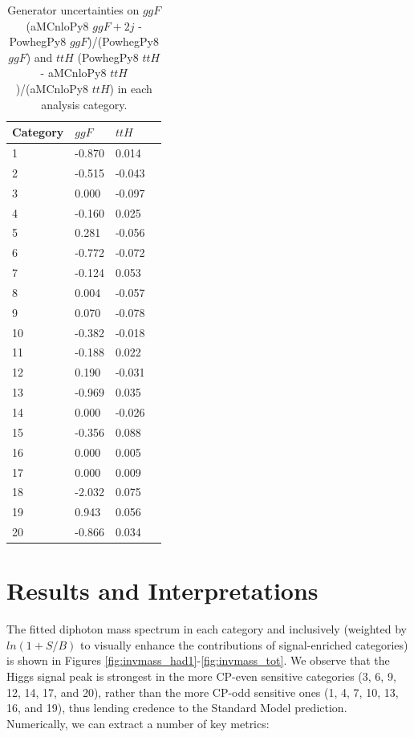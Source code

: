 \begin{table}[ht]
\begin{center}
\begin{tabular}{llll}
Category & $ggF$ & $ttH$ \\ \hline
\hline
1  &     -0.870 &      0.014 \\
2  &     -0.515 &     -0.043 \\
3  &      0.000 &     -0.097 \\
4  &     -0.160 &      0.025 \\
5  &      0.281 &     -0.056 \\
6  &     -0.772 &     -0.072 \\
7  &     -0.124 &      0.053 \\
8  &      0.004 &     -0.057 \\
9  &      0.070 &     -0.078 \\
10 &     -0.382 &     -0.018 \\
11 &     -0.188 &      0.022 \\
12 &      0.190 &     -0.031 \\ \hline
13 &     -0.969 &      0.035 \\
14 &      0.000 &     -0.026 \\
15 &     -0.356 &      0.088 \\
16 &      0.000 &      0.005 \\
17 &      0.000 &      0.009 \\
18 &     -2.032 &      0.075 \\
19 &      0.943 &      0.056 \\
20 &     -0.866 &      0.034 \\ \hline
\end{tabular}
\end{center}
\vspace{-0.5cm}
\caption{Generator uncertainties on $ggF$ (aMCnloPy8 $ggF+2j$ - PowhegPy8 $ggF$)/(PowhegPy8 $ggF$) and $ttH$ (PowhegPy8 $ttH$ - aMCnloPy8 $ttH$)/(aMCnloPy8 $ttH$) in each analysis category. }
\label{tab:mcgen}
\end{table}

\section{Results and Interpretations}\label{sec:results}

The fitted diphoton mass spectrum in each category and inclusively (weighted by $ln(1+S/B)$ to visually enhance the contributions of signal-enriched categories) is shown in Figures \ref{fig:invmass_had1}-\ref{fig:invmass_tot}. We observe that the Higgs signal peak is strongest in the more CP-even sensitive categories (3, 6, 9, 12, 14, 17, and 20), rather than the more CP-odd sensitive ones (1, 4, 7, 10, 13, 16, and 19), thus lending credence to the Standard Model prediction. Numerically, we can extract a number of key metrics:

